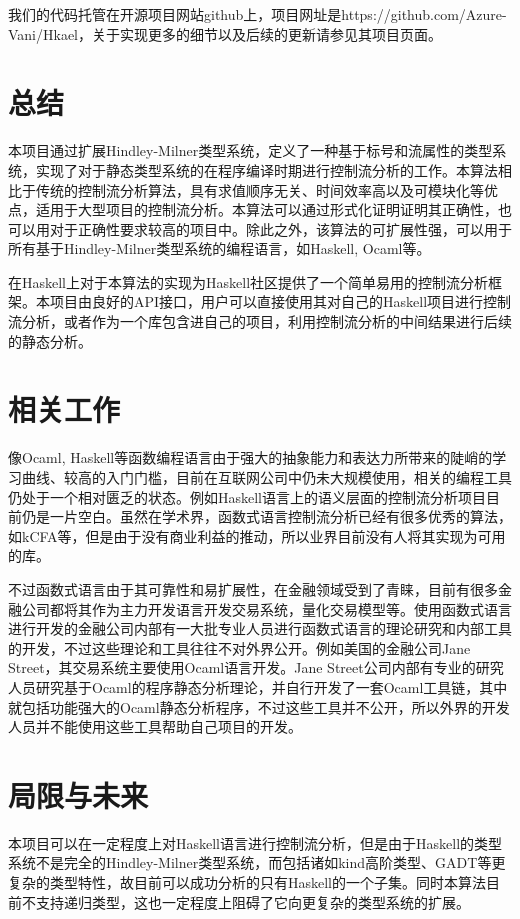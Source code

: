 \documentclass[UTF8, colorlinks]{pkuthss}
\begin{document}
	我们的代码托管在开源项目网站github上，项目网址是https://github.com/Azure-Vani/Hkael，关于实现更多的细节以及后续的更新请参见其项目页面。
	
	\section{总结}
	本项目通过扩展Hindley-Milner类型系统，定义了一种基于标号和流属性的类型系统，实现了对于静态类型系统的在程序编译时期进行控制流分析的工作。本算法相比于传统的控制流分析算法，具有求值顺序无关、时间效率高以及可模块化等优点，适用于大型项目的控制流分析。本算法可以通过形式化证明证明其正确性，也可以用对于正确性要求较高的项目中。除此之外，该算法的可扩展性强，可以用于所有基于Hindley-Milner类型系统的编程语言，如Haskell, Ocaml等。
	
	在Haskell上对于本算法的实现为Haskell社区提供了一个简单易用的控制流分析框架。本项目由良好的API接口，用户可以直接使用其对自己的Haskell项目进行控制流分析，或者作为一个库包含进自己的项目，利用控制流分析的中间结果进行后续的静态分析。
	\section{相关工作}
	像Ocaml, Haskell等函数编程语言由于强大的抽象能力和表达力所带来的陡峭的学习曲线、较高的入门门槛，目前在互联网公司中仍未大规模使用，相关的编程工具仍处于一个相对匮乏的状态。例如Haskell语言上的语义层面的控制流分析项目目前仍是一片空白。虽然在学术界，函数式语言控制流分析已经有很多优秀的算法，如kCFA等，但是由于没有商业利益的推动，所以业界目前没有人将其实现为可用的库。
	
	不过函数式语言由于其可靠性和易扩展性，在金融领域受到了青睐，目前有很多金融公司都将其作为主力开发语言开发交易系统，量化交易模型等。使用函数式语言进行开发的金融公司内部有一大批专业人员进行函数式语言的理论研究和内部工具的开发，不过这些理论和工具往往不对外界公开。例如美国的金融公司Jane Street，其交易系统主要使用Ocaml语言开发。Jane Street公司内部有专业的研究人员研究基于Ocaml的程序静态分析理论，并自行开发了一套Ocaml工具链，其中就包括功能强大的Ocaml静态分析程序，不过这些工具并不公开，所以外界的开发人员并不能使用这些工具帮助自己项目的开发。
	\section{局限与未来}
	本项目可以在一定程度上对Haskell语言进行控制流分析，但是由于Haskell的类型系统不是完全的Hindley-Milner类型系统，而包括诸如kind高阶类型、GADT等更复杂的类型特性，故目前可以成功分析的只有Haskell的一个子集。同时本算法目前不支持递归类型，这也一定程度上阻碍了它向更复杂的类型系统的扩展。
	
\end{document}
